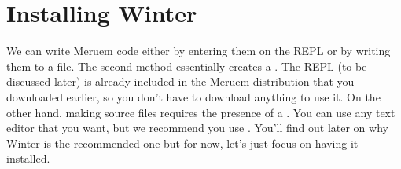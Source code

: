\section{Installing Winter}
We can write Meruem code either by entering them on the REPL or by writing them to a file. The second method essentially creates a . The REPL (to be discussed later) is already included in the Meruem distribution that you downloaded earlier, so you don't have to download anything to use it. On the other hand, making source files requires the presence of a . You can use any text editor that you want, but we recommend you use . You'll find out later on why Winter is the recommended one but for now, let's just focus on having it installed.

